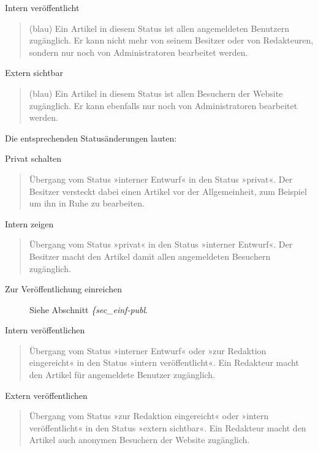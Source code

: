 \documentclass[a4paper,12pt,ngerman]{manual}
\begin{document}
Intern veröffentlicht
\begin{quote}

(blau) Ein Artikel in diesem Status ist allen
angemeldeten Benutzern zugänglich. Er kann nicht mehr von seinem Besitzer
oder von Redakteuren, sondern nur noch von Administratoren bearbeitet
werden.
\end{quote}

Extern sichtbar
\begin{quote}

(blau) Ein Artikel in diesem Status ist allen
Besuchern der Website zugänglich. Er kann ebenfalls nur noch von
Administratoren bearbeitet werden.
\end{quote}

Die entsprechenden Statusänderungen lauten:

Privat schalten
\begin{quote}

Übergang vom Status »interner Entwurf« in den
Status »privat«. Der Besitzer versteckt dabei einen Artikel vor der
Allgemeinheit, zum Beispiel um ihn in Ruhe zu bearbeiten.
\end{quote}

Intern zeigen
\begin{quote}

Übergang vom Status »privat« in den Status »interner
Entwurf«. Der Besitzer macht den Artikel damit allen angemeldeten Besuchern
zugänglich.
\end{quote}
\begin{description}
\item[Zur Veröffentlichung einreichen] \leavevmode
Siehe Abschnitt \emph{\{sec\_einf-publ}.

\end{description}

Intern veröffentlichen
\begin{quote}

Übergang vom Status »interner Entwurf« oder »zur
Redaktion eingereicht« in den Status »intern veröffentlicht«. Ein Redakteur
macht den Artikel für angemeldete Benutzer zugänglich.
\end{quote}

Extern veröffentlichen
\begin{quote}

Übergang vom Status »zur Redaktion eingereicht«
oder »intern veröffentlicht« in den Status »extern sichtbar«. Ein Redakteur
macht den Artikel auch anonymen Besuchern der Website zugänglich.
\end{quote}
\end{document}
